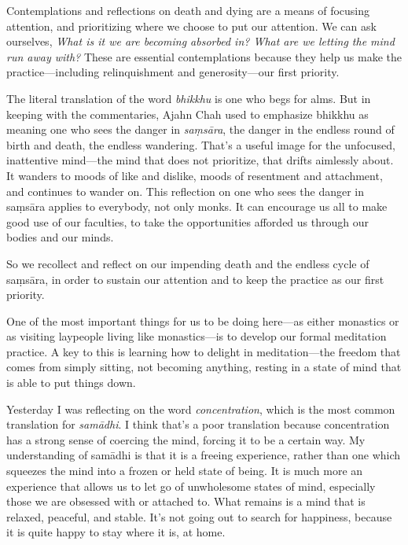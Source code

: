 
Contemplations and reflections on death and dying are a means of 
focusing attention, and prioritizing where we choose to put our 
attention. We can ask ourselves, \emph{What is it we are becoming 
absorbed in? What are we letting the mind run away with?} These are 
essential contemplations because they help us make the 
practice---including relinquishment and generosity---our first priority.

The literal translation of the word \emph{bhikkhu} is one who begs for 
alms. But in keeping with the commentaries, Ajahn Chah used to 
emphasize bhikkhu as meaning one who sees the danger in 
\emph{saṃsāra}, the danger in the endless round of birth and death, 
the endless wandering. That's a useful image for the unfocused, 
inattentive mind---the mind that does not prioritize, that drifts 
aimlessly about. It wanders to moods of like and dislike, moods of 
resentment and attachment, and continues to wander on. This reflection 
on one who sees the danger in saṃsāra applies to everybody, not only 
monks. It can encourage us all to make good use of our faculties, to 
take the opportunities afforded us through our bodies and our minds.

So we recollect and reflect on our impending death and the endless 
cycle of saṃsāra, in order to sustain our attention and to keep the 
practice as our first priority.


One of the most important things for us to be doing here---as either 
monastics or as visiting laypeople living like monastics---is to 
develop our formal meditation practice. A key to this is learning how 
to delight in meditation---the freedom that comes from simply sitting, 
not becoming anything, resting in a state of mind that is able to put 
things down.

Yesterday I was reflecting on the word \emph{concentration}, which is 
the most common translation for \emph{samādhi}. I think that's a poor 
translation because concentration has a strong sense of coercing the 
mind, forcing it to be a certain way. My understanding of samādhi is 
that it is a freeing experience, rather than one which squeezes the 
mind into a frozen or held state of being. It is much more an 
experience that allows us to let go of unwholesome states of mind, 
especially those we are obsessed with or attached to. What remains is a 
mind that is relaxed, peaceful, and stable. It's not going out to 
search for happiness, because it is quite happy to stay where it is, at 
home.

